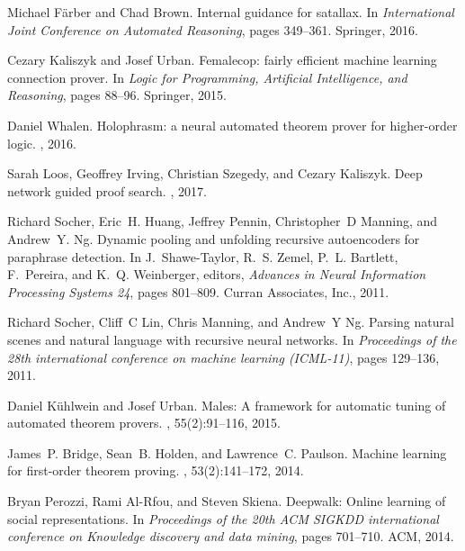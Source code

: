 \documentclass{article}
\begin{document}
\begin{thebibliography}{10}
Michael F{\"a}rber and Chad Brown.
\newblock Internal guidance for satallax.
\newblock In {\em International Joint Conference on Automated Reasoning}, pages
  349--361. Springer, 2016.

Cezary Kaliszyk and Josef Urban.
\newblock Femalecop: fairly efficient machine learning connection prover.
\newblock In {\em Logic for Programming, Artificial Intelligence, and
  Reasoning}, pages 88--96. Springer, 2015.

Daniel Whalen.
\newblock Holophrasm: a neural automated theorem prover for higher-order logic.
, 2016.

Sarah Loos, Geoffrey Irving, Christian Szegedy, and Cezary Kaliszyk.
\newblock Deep network guided proof search.
, 2017.

Richard Socher, Eric~H. Huang, Jeffrey Pennin, Christopher~D Manning, and
  Andrew~Y. Ng.
\newblock Dynamic pooling and unfolding recursive autoencoders for paraphrase
  detection.
\newblock In J.~Shawe-Taylor, R.~S. Zemel, P.~L. Bartlett, F.~Pereira, and
  K.~Q. Weinberger, editors, {\em Advances in Neural Information Processing
  Systems 24}, pages 801--809. Curran Associates, Inc., 2011.

Richard Socher, Cliff~C Lin, Chris Manning, and Andrew~Y Ng.
\newblock Parsing natural scenes and natural language with recursive neural
  networks.
\newblock In {\em Proceedings of the 28th international conference on machine
  learning (ICML-11)}, pages 129--136, 2011.

Daniel K{\"u}hlwein and Josef Urban.
\newblock Males: A framework for automatic tuning of automated theorem provers.
, 55(2):91--116, 2015.

James~P. Bridge, Sean~B. Holden, and Lawrence~C. Paulson.
\newblock Machine learning for first-order theorem proving.
, 53(2):141--172, 2014.

Bryan Perozzi, Rami Al-Rfou, and Steven Skiena.
\newblock Deepwalk: Online learning of social representations.
\newblock In {\em Proceedings of the 20th ACM SIGKDD international conference
  on Knowledge discovery and data mining}, pages 701--710. ACM, 2014.


\end{thebibliography}
\end{document}

